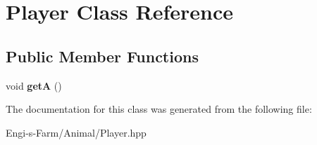 \hypertarget{class_player}{}\section{Player Class Reference}
\label{class_player}
\subsection*{Public Member Functions}
\begin{DoxyCompactItemize}
\item 
\mbox{\label{class_player_a317bc6b6ec8fb2dd6909d489d8e4db1e}} 
void {\bfseries getA} ()
\end{DoxyCompactItemize}


The documentation for this class was generated from the following file\+:\begin{DoxyCompactItemize}
\item 
Engi-\/s-\/\+Farm/\+Animal/Player.\+hpp\end{DoxyCompactItemize}
